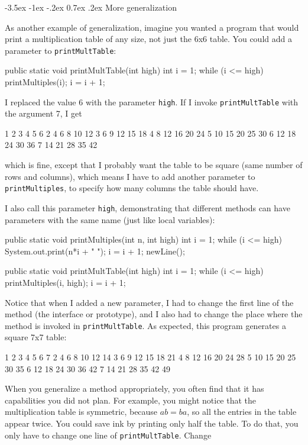 \documentclass{book}
\makeatletter
\renewcommand{\section}{\@startsection 
    {section} {1} {0mm}%
    {-3.5ex \@plus -1ex \@minus -.2ex}%
    {0.7ex \@plus.2ex}%
    {\normalfont\Large\bfseries}}
\makeatother
\begin{document}

\section{More generalization}

As another example of generalization, imagine you wanted
a program that would print a multiplication table of any
size, not just the 6x6 table.  You could add a parameter to
{\tt printMultTable}:

\begin{verbatimtab}
  public static void printMultTable(int high) {
    int i = 1;
    while (i <= high) {
      printMultiples(i);
      i = i + 1;
    }
  }
\end{verbatimtab}
%
I replaced the value 6 with the parameter {\tt high}.  If I
invoke {\tt printMultTable} with the argument 7, I get

\begin{verbatimtab}
1   2   3   4   5   6   
2   4   6   8   10   12   
3   6   9   12   15   18   
4   8   12   16   20   24   
5   10   15   20   25   30   
6   12   18   24   30   36   
7   14   21   28   35   42   
\end{verbatimtab}
%
which is fine, except that I probably want the table to
be square (same number of rows and columns), which means
I have to add another parameter to {\tt printMultiples},
to specify how many columns the table should have.

I also call this parameter {\tt high},
demonstrating that different methods can have parameters
with the same name (just like local variables):

\begin{verbatimtab}
  public static void printMultiples(int n, int high) {
    int i = 1;
    while (i <= high) {
      System.out.print(n*i + "   ");
      i = i + 1;
    }    
    newLine();
  }

  public static void printMultTable(int high) {
    int i = 1;
    while (i <= high) {
      printMultiples(i, high);
      i = i + 1;
    }
  }
\end{verbatimtab}
%
Notice that when I added a new parameter, I had to change the first
line of the method (the interface or prototype), and I also had to
change the place where the method is invoked in {\tt printMultTable}.
As expected, this program generates a square 7x7 table:

\begin{verbatimtab}
1   2   3   4   5   6   7   
2   4   6   8   10   12   14   
3   6   9   12   15   18   21   
4   8   12   16   20   24   28   
5   10   15   20   25   30   35   
6   12   18   24   30   36   42   
7   14   21   28   35   42   49
\end{verbatimtab}
%
When you generalize a method appropriately, you often find
that it has capabilities you did not plan.
For example, you might notice that the multiplication table
is symmetric, because $ab = ba$, so all the entries in the
table appear twice.  You could save ink by printing only
half the table.  To do that, you only have to change one
line of {\tt printMultTable}.  Change
\end{document}

